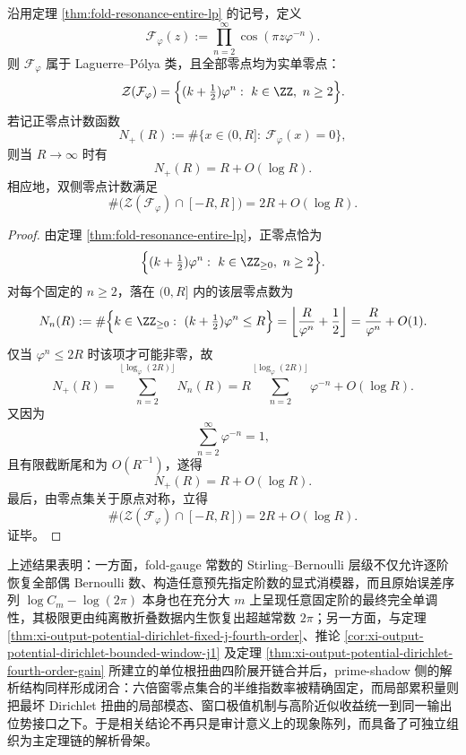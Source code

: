 \begin{theorem}[共振整函数零点计数的线性主项]\label{thm:xi-fold-resonance-entire-zero-counting-linear}
沿用定理 \ref{thm:fold-resonance-entire-lp} 的记号，定义
\[
\mathcal F_\varphi(z):=\prod_{n=2}^{\infty}\cos(\pi z\varphi^{-n}).
\]
则 \(\mathcal F_\varphi\) 属于 Laguerre--P\'olya 类，且全部零点均为实单零点：
\[
\mathcal Z(\mathcal F_\varphi)=\Bigl\{(k+\tfrac12)\varphi^n:\ k\in\ZZ,\ n\ge 2\Bigr\}.
\]
若记正零点计数函数
\[
N_+(R):=\#\{x\in(0,R]:\ \mathcal F_\varphi(x)=0\},
\]
则当 \(R\to\infty\) 时有
\[
\boxed{\;
N_+(R)=R+O(\log R).\;}
\]
相应地，双侧零点计数满足
\[
\boxed{\;
\#\bigl(\mathcal Z(\mathcal F_\varphi)\cap[-R,R]\bigr)=2R+O(\log R).\;}
\]
\end{theorem}
\begin{proof}
由定理 \ref{thm:fold-resonance-entire-lp}，正零点恰为
\[
\Bigl\{(k+\tfrac12)\varphi^n:\ k\in\ZZ_{\ge 0},\ n\ge 2\Bigr\}.
\]
对每个固定的 \(n\ge 2\)，落在 \((0,R]\) 内的该层零点数为
\[
N_n(R)
:=
\#\Bigl\{k\in\ZZ_{\ge 0}:\ (k+\tfrac12)\varphi^n\le R\Bigr\}
=
\left\lfloor \frac{R}{\varphi^n}+\frac12\right\rfloor
=
\frac{R}{\varphi^n}+O(1).
\]
仅当 \(\varphi^n\le 2R\) 时该项才可能非零，故
\[
N_+(R)
=
\sum_{n=2}^{\lfloor \log_\varphi(2R)\rfloor}N_n(R)
=
R\sum_{n=2}^{\lfloor \log_\varphi(2R)\rfloor}\varphi^{-n}
+O(\log R).
\]
又因为
\[
\sum_{n=2}^{\infty}\varphi^{-n}=1,
\]
且有限截断尾和为 \(O(R^{-1})\)，遂得
\[
N_+(R)=R+O(\log R).
\]
最后，由零点集关于原点对称，立得
\[
\#\bigl(\mathcal Z(\mathcal F_\varphi)\cap[-R,R]\bigr)=2R+O(\log R).
\]
证毕。
\end{proof}




\noindent 上述结果表明：一方面，fold-gauge 常数的 Stirling--Bernoulli 层级不仅允许逐阶恢复全部偶 Bernoulli 数、构造任意预先指定阶数的显式消模器，而且原始误差序列 \(\log C_m-\log(2\pi)\) 本身也在充分大 \(m\) 上呈现任意固定阶的最终完全单调性，其极限更由纯离散折叠数据内生恢复出超越常数 \(2\pi\)；另一方面，与定理 \ref{thm:xi-output-potential-dirichlet-fixed-j-fourth-order}、推论 \ref{cor:xi-output-potential-dirichlet-bounded-window-j1} 及定理 \ref{thm:xi-output-potential-dirichlet-fourth-order-gain} 所建立的单位根扭曲四阶展开链合并后，prime-shadow 侧的解析结构同样形成闭合：六倍窗零点集合的半维指数率被精确固定，而局部累积量则把最坏 Dirichlet 扭曲的局部模态、窗口极值机制与高阶近似收益统一到同一输出位势接口之下。于是相关结论不再只是审计意义上的现象陈列，而具备了可独立组织为主定理链的解析骨架。



\endinput
